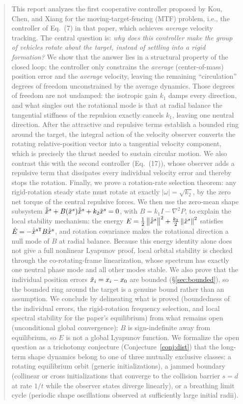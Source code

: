 \begin{abstract}
\noindent
This report analyzes the first cooperative controller proposed by Kou, Chen, and Xiang
\cite{kou2022cooperative} for the moving-target-fencing (MTF) problem, i.e., the controller
of Eq.~(7) in that paper, which achieves \emph{average} velocity tracking. The central question
is: \emph{why does this controller make the group of vehicles rotate about the target, instead of
settling into a rigid formation?} We show that the answer lies in a structural property of the
closed loop: the controller only constrains the \emph{average} (center-of-mass) position error and
the \emph{average} velocity, leaving the remaining ``circulation'' degrees of freedom
unconstrained by the average dynamics. Those degrees of freedom are not undamped: the isotropic gain
$k_1$ damps every direction, and what singles out the rotational mode is that at radial balance the
tangential stiffness of the repulsion exactly cancels $k_1$, leaving one neutral direction. After the attractive and repulsive terms establish a bounded ring around the target, the
integral action of the velocity observer converts the rotating relative-position vector into a
tangential velocity component, which is precisely the thrust needed to sustain circular motion.
We also contrast this with the second controller (Eq.~(17)), whose observer adds a repulsive term
that dissipates every individual velocity error and thereby stops the rotation. Finally, we prove a
rotation-rate selection theorem: any rigid-rotation steady state must rotate at exactly
$|\omega|=\sqrt{k_2}$, by the zero net torque of the central repulsive forces. We then use the zero-mean shape subsystem
$\ddot{\txi}^s+B(\txi^s)\dot{\txi}^s+k_2\txi^s=0$, with $B=k_1I-\nabla^2P$, to explain the local
stability mechanism: the energy $E=\tfrac12\norm{\dot{\txi}^s}^2+\tfrac{k_2}2\norm{\txi^s}^2$
satisfies $\dot E=-\dot{\txi}^{s\mathsf T}B\dot{\txi}^s$, and rotation covariance makes the
rotational direction a null mode of $B$ at radial balance. Because this energy identity alone does
not give a full nonlinear Lyapunov proof, local orbital stability is checked through the
co-rotating-frame linearization, whose spectrum has exactly one neutral phase mode and all other
modes stable. We also prove that the individual position errors $\txi_i=x_i-x_0$ are bounded
(\S\ref{sec:bounded}), so the bounded ring around the target is a genuine bound rather than an
assumption. We conclude by delineating what is proved (boundedness of the individual errors, the
rigid-rotation frequency selection, and local spectral stability for the paper's equilibrium) from
what remains open (unconditional global convergence): $B$ is sign-indefinite away from equilibrium,
so $E$ is not a global Lyapunov
function. We formalize the open question as a trichotomy conjecture (Conjecture~\ref{conj:dist})
that the long-term shape dynamics belong to one of three mutually exclusive classes: a rotating
equilibrium orbit (generic initializations), a jammed boundary (collinear or cross initializations
that converge to the collision barrier $s=d$ at rate $1/t$ while the observer states diverge
linearly), or a breathing limit cycle (periodic shape oscillations observed at sufficiently large
initial radii).
\end{abstract}